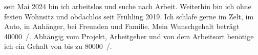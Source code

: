 		seit Mai 2024 bin ich arbeitslos und suche nach Arbeit.
		Weiterhin bin ich ohne festen Wohnsitz und obdachlos seit Frühling 2019.
		Ich schlafe gerne im Zelt, im Auto, in Anhänger, bei Freunden und Familie.
		Mein Wunschgehalt beträgt \SI{40000}{\sieuro/\year}.
		Abhängig vom Projekt, Arbeitgeber und von dem Arbeitsort benötige ich ein Gehalt von bis zu \SI{80000}{\sieuro/\year}.